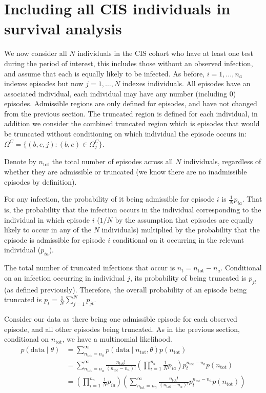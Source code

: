 \documentclass[thesis.tex]{subfiles}
\begin{document}
\chapter{Including all CIS individuals in survival analysis} \label{appendix:total-model}


We now consider all $N$ individuals in the CIS cohort who have at
least one test during the period of interest, this includes those
without an observed infection, and assume that each is equally likely to
be infected. As before, $i = 1, \dots, n_a$ indexes episodes but now
$j = 1, \dots, N$ indexes individuals. All episodes have an associated
individual, each individual may have any number (including 0) episodes.
Admissible regions are only defined for episodes, and have not changed
from the previous section. The truncated region is defined for each
individual, in addition we consider the combined truncated region which
is episodes that would be truncated without conditioning on which
individual the episode occurs in:
$\Omega^C = \{ (b, e, j) : (b, e) \in \Omega_j^C \}$.

Denote by $n_\text{tot}$ the total number of episodes across all $N$
individuals, regardless of whether they are admissible or truncated (we
know there are no inadmissible episodes by definition).

For any infection, the probability of it being admissible for episode
$i$ is $\frac{1}{N} p_{ia}$. That is, the probability that the
infection occurs in the individual corresponding to the individual in
which episode $i$ ($1/N$ by the assumption that episodes are equally
likely to occur in any of the $N$ individuals) multiplied by the
probability that the episode is admissible for episode $i$ conditional
on it occurring in the relevant individual ($p_{ia}$).

The total number of truncated infections that occur is
$n_t = n_\text{tot} - n_a$. Conditional on an infection occurring in
individual $j$, its probability of being truncated is $p_{jt}$ (as
defined previously). Therefore, the overall probability of an episode
being truncated is $p_t = \frac{1}{N} \sum_{j=1}^N p_{jt}$.

Consider our data as there being one admissible episode for each
observed episode, and all other episodes being truncated. As in the
previous section, conditional on $n_\text{tot}$, we have a multinomial
likelihood.
\begin{align}
p(\text{data} \mid \theta)
&= \sum_{n_\text{tot}=n_a}^\infty p(\text{data} \mid n_\text{tot}, \theta) p(n_\text{tot}) \\
&= \sum_{n_\text{tot}=n_a}^\infty \frac{n_\text{tot}!}{(n_\text{tot}-n_a)!} \left( \prod_{i=1}^{n_a} \frac{1}{N} p_{ia} \right) p_t^{n_\text{tot}-n_a} p(n_\text{tot}) \\
&= \left( \prod_{i=1}^{n_a} \frac{1}{N} p_{ia} \right) \left( \sum_{n_\text{tot}=n_a}^\infty \frac{n_\text{tot}!}{(n_\text{tot}-n_a)!} p_t^{n_\text{tot}-n_a} p(n_\text{tot}) \right) \\
\end{align}
\end{document}
